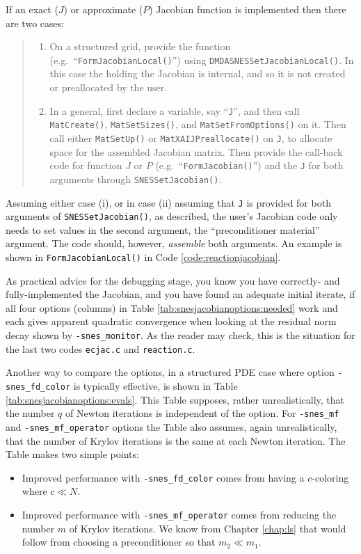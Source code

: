 If an exact ($J$) or approximate ($P$) Jacobian function is implemented then there are two cases:
\begin{quote}
  \renewcommand{\labelenumi}{(\roman{enumi})}
  \begin{enumerate}
  \item On a structured grid, provide the function (e.g.~``\texttt{FormJacobianLocal()}'') using \texttt{DMDASNESSetJacobianLocal()}.  In this case the \pMat holding the Jacobian is internal, and so it is not created or preallocated by the user.
  \item In a general, first declare a \pMat variable, say ``\texttt{J}'', and then call \texttt{MatCreate()}, \texttt{MatSetSizes()}, and \texttt{MatSetFromOptions()} on it.  Then call either \texttt{MatSetUp()} or \texttt{MatXAIJPreallocate()} on \texttt{J}, to allocate space for the assembled Jacobian matrix.  Then provide the call-back code for function $J$ or $P$ (e.g.~``\texttt{FormJacobian()}'') and the \pMat \texttt{J} for both \pMat arguments through \texttt{SNESSetJacobian()}.
  \end{enumerate}
\end{quote}

Assuming either case (i), or in case (ii) assuming that \texttt{J} is provided for both \pMat arguments of \texttt{SNESSetJacobian()}, as described, the user's Jacobian code only needs to set values in the second \pMat argument, the ``preconditioner material'' argument.  The code should, however, \emph{assemble} both \pMat arguments.  An example is shown in \texttt{FormJacobianLocal()} in Code \ref{code:reactionjacobian}.

As practical advice for the debugging stage, you know you have correctly- and fully-implemented the Jacobian, and you have found an adequate initial iterate, if all four options (columns) in Table \ref{tab:snesjacobianoptions:needed} work and each gives apparent quadratic convergence when looking at the residual norm decay shown by \texttt{-snes\_monitor}.  As the reader may check, this is the situation for the last two codes \texttt{ecjac.c} and \texttt{reaction.c}.

Another way to compare the options, in a structured PDE case where option \texttt{-snes\_fd\_color} is typically effective, is shown in Table \ref{tab:snesjacobianoptions:evals}.  This Table supposes, rather unrealistically, that the number $q$ of Newton iterations is independent of the option.  For \texttt{-snes\_mf} and \texttt{-snes\_mf\_operator} options the Table also assumes, again unrealistically, that the number of Krylov iterations is the same at each Newton iteration.  The Table makes two simple points:\begin{itemize}
\item Improved performance with \texttt{-snes\_fd\_color} comes from having a $c$-coloring where $c \ll N$.
\item Improved performance with \texttt{-snes\_mf\_operator} comes from reducing the number $m$ of Krylov iterations.  We know from Chapter \ref{chap:ls} that would follow from choosing a preconditioner so that $m_2 \ll m_1$.
\end{itemize}

